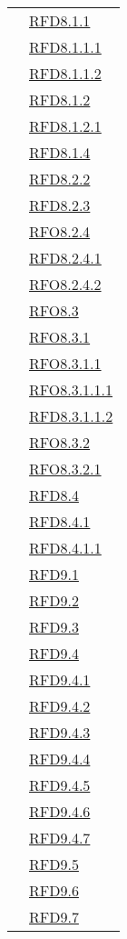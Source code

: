 \begin{longtable}{|>{\centering}m{5cm}|m{5cm}<{\centering}|}
& \hyperlink{RFD8.1.1}{RFD8.1.1}\\
& \hyperlink{RFD8.1.1.1}{RFD8.1.1.1}\\
& \hyperlink{RFD8.1.1.2}{RFD8.1.1.2}\\
& \hyperlink{RFD8.1.2}{RFD8.1.2}\\
& \hyperlink{RFD8.1.2.1}{RFD8.1.2.1}\\
& \hyperlink{RFD8.1.4}{RFD8.1.4}\\
& \hyperlink{RFD8.2.2}{RFD8.2.2}\\
& \hyperlink{RFD8.2.3}{RFD8.2.3}\\
& \hyperlink{RFO8.2.4}{RFO8.2.4}\\
& \hyperlink{RFD8.2.4.1}{RFD8.2.4.1}\\
& \hyperlink{RFO8.2.4.2}{RFO8.2.4.2}\\
& \hyperlink{RFO8.3}{RFO8.3}\\
& \hyperlink{RFO8.3.1}{RFO8.3.1}\\
& \hyperlink{RFO8.3.1.1}{RFO8.3.1.1}\\
& \hyperlink{RFO8.3.1.1.1}{RFO8.3.1.1.1}\\
& \hyperlink{RFD8.3.1.1.2}{RFD8.3.1.1.2}\\
& \hyperlink{RFO8.3.2}{RFO8.3.2}\\
& \hyperlink{RFO8.3.2.1}{RFO8.3.2.1}\\
& \hyperlink{RFD8.4}{RFD8.4}\\
& \hyperlink{RFD8.4.1}{RFD8.4.1}\\
& \hyperlink{RFD8.4.1.1}{RFD8.4.1.1}\\
& \hyperlink{RFD9.1}{RFD9.1}\\
& \hyperlink{RFD9.2}{RFD9.2}\\
& \hyperlink{RFD9.3}{RFD9.3}\\
& \hyperlink{RFD9.4}{RFD9.4}\\
& \hyperlink{RFD9.4.1}{RFD9.4.1}\\
& \hyperlink{RFD9.4.2}{RFD9.4.2}\\
& \hyperlink{RFD9.4.3}{RFD9.4.3}\\
& \hyperlink{RFD9.4.4}{RFD9.4.4}\\
& \hyperlink{RFD9.4.5}{RFD9.4.5}\\
& \hyperlink{RFD9.4.6}{RFD9.4.6}\\
& \hyperlink{RFD9.4.7}{RFD9.4.7}\\
& \hyperlink{RFD9.5}{RFD9.5}\\
& \hyperlink{RFD9.6}{RFD9.6}\\
& \hyperlink{RFD9.7}{RFD9.7}\\

\end{longtable}
